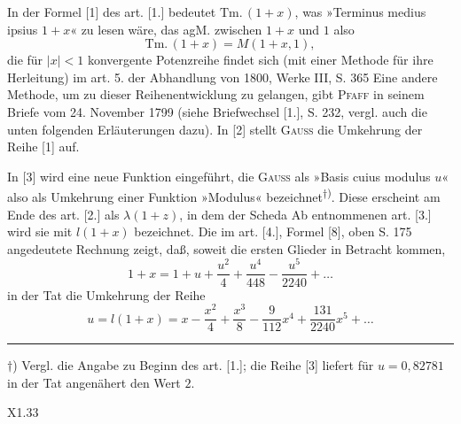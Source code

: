 \begingroup
\makeatletter\tagsleft@true\let\veqno\@@leqno\makeatother
\fancyhead{}
\begin{center}\end{center}
\par\indent In der Formel [1] des art. [1.] bedeutet $\mathrm{Tm.}\,(1+x)$, was »Terminus medius ipsius $1+x$« zu lesen wäre, das agM. zwischen $1+x$ und $1$ also
\begin{equation*}\tag*{$[1]'$}\mathrm{Tm.}\,(1+x)=M(1+x,1),\end{equation*}
\noindent die für $|x|<1$ konvergente Potenzreihe findet sich (mit einer Methode für ihre Herleitung) im art. 5. der Abhandlung von 1800, Werke III, S. 365 Eine andere Methode, um zu dieser Reihenentwicklung zu gelangen, gibt \textsc{Pfaff} in seinem Briefe vom 24. November 1799 (siehe Briefwechsel [1.], S. 232, vergl. auch die unten folgenden Erläuterungen dazu). In [2] stellt \textsc{Gauss} die Umkehrung der Reihe [1] auf.
\par\indent In [3] wird eine neue Funktion eingeführt, die \textsc{Gauss} als »Basis cuius modulus $u$« also als Umkehrung einer Funktion »Modulus« bezeichnet\textsuperscript{$\dagger$)}. Diese erscheint am Ende des art. [2.] als $\lambda(1+z)$, in dem der Scheda Ab entnommenen art. [3.] wird sie mit $l(1+x)$ bezeichnet. Die im art. [4.], Formel [8], oben S. 175 angedeutete Rechnung zeigt, daß, soweit die ersten Glieder in Betracht kommen,
\begin{equation*}\tag*{$[3]'$}1+x=1+u+\frac{u^2}{4}+\frac{u^4}{448}-\frac{u^5}{2240}+\ldots\end{equation*}
\noindent in der Tat die Umkehrung der Reihe
\begin{equation*}\tag*{$[6]'$}u=l(1+x)=x-\frac{x^2}{4}+\frac{x^3}{8}-\frac9{112}x^4+\frac{131}{2240}x^5+\ldots\end{equation*}
\vfill
\par\smallskip\noindent\rule{.25\linewidth}{.4pt}\par
{\small\par\indent $\dagger$) Vergl. die Angabe zu Beginn des art. [1.]; die Reihe [3] liefert für $u=0{,}82781$ in der Tat angenähert den Wert $2$.\par}
\noindent X1.\hfill33\par
\clearpage
{}
